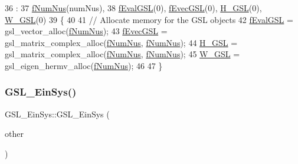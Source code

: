 \begin{DoxyCode}
36                                  : 
37 \hyperlink{structOscProb_1_1GSL__EinSys_abb8928986203b5904d078f4f4e337a99}{fNumNus}(numNus), 
38 \hyperlink{structOscProb_1_1GSL__EinSys_af69688ebfa983199ae54513628658b4d}{fEvalGSL}(0), \hyperlink{structOscProb_1_1GSL__EinSys_a91ee7084c424d7a92b5001931e036fd6}{fEvecGSL}(0), \hyperlink{structOscProb_1_1GSL__EinSys_a853e4eae015326445776f9ad7e17e513}{H\_GSL}(0), \hyperlink{structOscProb_1_1GSL__EinSys_a366b813a541dcfbaad2ac3d096f31aa1}{W\_GSL}(0)
39 \{
40 
41   \textcolor{comment}{// Allocate memory for the GSL objects}
42   \hyperlink{structOscProb_1_1GSL__EinSys_af69688ebfa983199ae54513628658b4d}{fEvalGSL} = gsl\_vector\_alloc(\hyperlink{structOscProb_1_1GSL__EinSys_abb8928986203b5904d078f4f4e337a99}{fNumNus});
43   \hyperlink{structOscProb_1_1GSL__EinSys_a91ee7084c424d7a92b5001931e036fd6}{fEvecGSL} = gsl\_matrix\_complex\_alloc(\hyperlink{structOscProb_1_1GSL__EinSys_abb8928986203b5904d078f4f4e337a99}{fNumNus}, \hyperlink{structOscProb_1_1GSL__EinSys_abb8928986203b5904d078f4f4e337a99}{fNumNus});
44   \hyperlink{structOscProb_1_1GSL__EinSys_a853e4eae015326445776f9ad7e17e513}{H\_GSL} = gsl\_matrix\_complex\_alloc(\hyperlink{structOscProb_1_1GSL__EinSys_abb8928986203b5904d078f4f4e337a99}{fNumNus}, \hyperlink{structOscProb_1_1GSL__EinSys_abb8928986203b5904d078f4f4e337a99}{fNumNus});
45   \hyperlink{structOscProb_1_1GSL__EinSys_a366b813a541dcfbaad2ac3d096f31aa1}{W\_GSL} = gsl\_eigen\_hermv\_alloc(\hyperlink{structOscProb_1_1GSL__EinSys_abb8928986203b5904d078f4f4e337a99}{fNumNus});
46 
47 \}
\end{DoxyCode}
\mbox{\label{structOscProb_1_1GSL__EinSys_adec9051a3cee7956d84d230f371fa898}} 
\subsubsection{\texorpdfstring{G\+S\+L\+\_\+\+Ein\+Sys()}{GSL\_EinSys()}\hspace{0.1cm}{\footnotesize\ttfamily [2/2]}}
{\footnotesize\ttfamily G\+S\+L\+\_\+\+Ein\+Sys\+::\+G\+S\+L\+\_\+\+Ein\+Sys (\begin{DoxyParamCaption}\item[{const \hyperlink{structOscProb_1_1GSL__EinSys}{G\+S\+L\+\_\+\+Ein\+Sys} \&}]{other }\end{DoxyParamCaption})}

